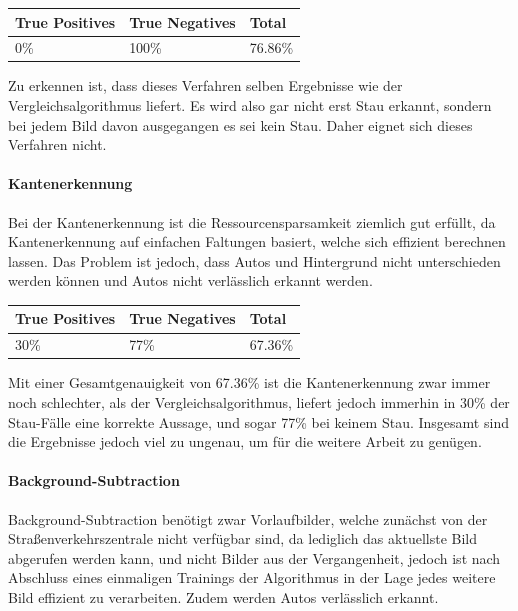 \begin{center}
\scriptsize
    \begin{tabular}{ | l | l | l |}
    \hline
		True Positives & True Negatives & Total \\ \hline
    0\% &
		100\% &
		76.86\% \\
    \hline
    \end{tabular}
\end{center}

Zu erkennen ist, dass dieses Verfahren selben Ergebnisse wie der Vergleichsalgorithmus liefert. Es wird also gar nicht erst Stau erkannt, sondern bei jedem Bild davon ausgegangen es sei kein Stau. Daher eignet sich dieses Verfahren nicht.

\paragraph{Kantenerkennung}
Bei der Kantenerkennung ist die Ressourcensparsamkeit ziemlich gut erfüllt, da Kantenerkennung auf einfachen Faltungen basiert, welche sich effizient berechnen lassen.
Das Problem ist jedoch, dass Autos und Hintergrund nicht unterschieden werden können und Autos nicht verlässlich erkannt werden.

\begin{center}
\scriptsize
    \begin{tabular}{ | l | l | l |}
    \hline
		True Positives & True Negatives & Total \\ \hline
    30\% &
		77\% &
		67.36\% \\
    \hline
    \end{tabular}
\end{center}

Mit einer Gesamtgenauigkeit von 67.36\% ist die Kantenerkennung zwar immer noch schlechter, als der Vergleichsalgorithmus, liefert jedoch immerhin in 30\% der Stau-Fälle eine korrekte Aussage, und sogar 77\% bei keinem Stau. Insgesamt sind die Ergebnisse jedoch viel zu ungenau, um für die weitere Arbeit zu genügen.

\paragraph{Background-Subtraction}
Background-Subtraction benötigt zwar Vorlaufbilder, welche zunächst von der Straßenverkehrszentrale nicht verfügbar sind, da lediglich das aktuellste Bild abgerufen werden kann, und nicht Bilder aus der Vergangenheit, jedoch ist nach Abschluss eines einmaligen Trainings der Algorithmus in der Lage jedes weitere Bild effizient zu verarbeiten. Zudem werden Autos verlässlich erkannt.

